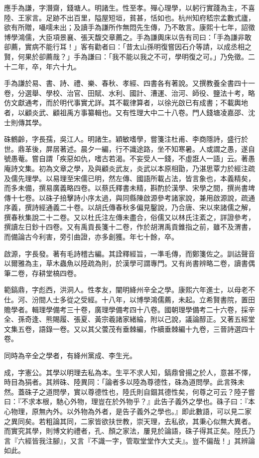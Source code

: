 \begin{pinyinscope}
應手為謙，字潛齋，錢塘人。明諸生。性至孝。殫心理學，以躬行實踐為主，不喜陸、王家言。足跡不出百里，隘屋短垣，貧甚，恬如也。杭州知府嵇宗孟數式廬，欲有所贈，囁嚅未出；及讀手為謙所作無悶先生傳，乃不敢言。康熙十七年，詔徵博學鴻儒，大臣項景襄、張天馥交章薦之。手為謙輿床以告有司曰：「手為謙非敢卻薦，實病不能行耳！」客有勸者曰：「昔太山孫明復嘗因石介等請，以成丞相之賢，何果於卻薦哉？」手為謙曰：「我不能以我之不可，學明復之可。」乃免徵。二十二年，卒，年六十九。

手為謙於易、書、詩、禮、樂、春秋、孝經、四書各有著說。又撰教養全書四十一卷，分選舉、學校、治官、田賦、水利、國計、漕運、治河、師役、鹽法十考，略仿文獻通考，而於明代事實尤詳。其不載律算者，以徐光啟已有成書；不載輿地者，以顧炎武、顧祖禹方事纂輯也。又有性理大中二十八卷。門人錢塘凌嘉邵、沈士則傳其學。

硃鶴齡，字長孺，吳江人。明諸生。穎敏嗜學，嘗箋注杜甫、李商隱詩，盛行於世。鼎革後，屏居著述。晨夕一編，行不識途路，坐不知寒暑。人或謂之愚，遂自號愚菴。嘗自謂「疾惡如仇，嗜古若渴。不妄受人一錢，不虛誑人一語」云。著愚庵詩文集。初為文章之學，及與顧炎武友，炎武以本原相勖，乃湛思覃力於經注疏及儒先理學。以易理至宋儒已明，然左傳、國語所載占法，皆言象也，本義精矣，而多未備，撰易廣義略四卷。以蔡氏釋書未精，斟酌於漢學、宋學之間，撰尚書埤傳十七卷。以硃子掊擊詩小序太過，與同縣陳啟源參考諸家說，兼用啟源說，疏通序義，撰詩經通義二十卷。以胡氏傳春秋多偏見鑿說，乃合唐、宋以來諸儒之解，撰春秋集說二十二卷。又以杜氏注左傳未盡合，俗儒又以林氏注紊之，詳證參考，撰讀左日鈔十四卷。又有禹貢長箋十二卷，作於胡渭禹貢錐指之前，雖不及渭書，而備論古今利害，旁引曲證，亦多創獲。年七十餘，卒。

啟源，字長發。著有毛詩稽古編。其詮釋經旨，一準毛傳，而鄭箋佐之。訓詁聲音以爾雅為主，草木蟲魚以陸疏為則，於漢學可謂專門。又有尚書辨略二卷，讀書偶筆二卷，存耕堂槁四卷。

範鎬鼎，字彪西，洪洞人。性孝友，闡明絳州辛全之學。康熙六年進士，以母老不仕。河、汾間人士多從之受經。十八年，以博學鴻儒薦，未起。立希賢書院，置田贍學者。輯理學備考三十卷，廣理學備考四十八卷。國朝理學備考二十六卷，採辛全、孫奇逢、熊賜履、張夏、黃宗羲諸家緒綸，附以己說，議論醇正。又著五經堂文集五卷，語錄一卷。又以其父蕓茂有垂棘編，作續垂棘編十九卷，三晉詩選四十卷。

同時為辛全之學者，有絳州黨成、李生光。

成，字憲公。其學以明理去私為本。生平不求人知，鎬鼎曾揚之於人，意甚不懌，時目為狷者。其辨硃、陸異同：「論者多以陸為尊德性，硃為道問學。此言殊未然。蓋硃子之道問學，實以尊德性也，陸氏則自錮其德性矣，何尊之可云？陸子嘗曰：『不求本根，馳心外物，理豈在於外物乎？』此告子義外之學也。硃子曰：『本心物理，原無內外。以外物為外者，是告子義外之學也。』即此數語，可以見二家之異同矣。若粗論其同，二家皆欲扶世教，崇天理，去私欲，其秉心似無大異者。而實究其學，則博文約禮者，孔、顏之家法，屢見於論語，硃子得其正矣。陸氏乃言『六經皆我注腳』，又言『不識一字，管取堂堂作大丈夫』。豈不偏哉！」其辨論如此。


\end{pinyinscope}
